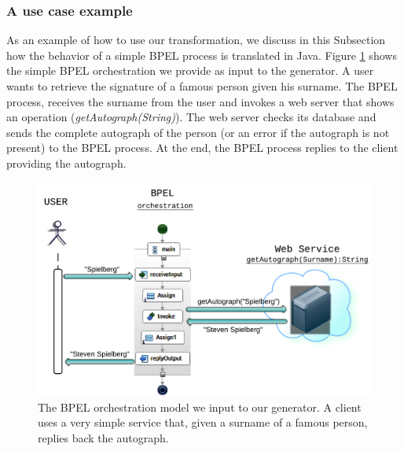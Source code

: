 \subsubsection{A use case example}
As an example of how to use our transformation, we discuss in this Subsection how the behavior of a simple BPEL process is translated in Java. Figure \ref{fig:BPELOrchestr} shows the simple BPEL orchestration we provide as input to the generator. A user wants to retrieve the signature of a famous person given his surname. The BPEL process, receives the surname from the user and invokes a web server that shows an operation (\textit{getAutograph(String)}). The web server checks its database and sends the complete autograph of the person (or an error if the autograph is not present) to the BPEL process. At the end, the BPEL process replies to the client providing the autograph.
\begin{figure}
  \begin{center}
    \includegraphics[scale=1.2]{pictures/UseCaseExampleBPELOrchestr.png}
    \caption{The BPEL orchestration model we input to our generator. A client uses a very simple service that, given a surname of a famous person, replies back the autograph.}
    \label{fig:BPELOrchestr}
  \end{center}
\end{figure}


